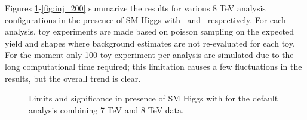 Figures \ref{fig:inj_125_7-8TeV}-\ref{fig:inj_200} summarize the results for various 8 TeV analysis 
configurations in the presence of SM Higgs with  \GeV\ and  \GeV\ respectively.
For each analysis, toy experiments are made based on poisson sampling on the expected yield 
and shapes where background estimates are not re-evaluated for each toy.
For the moment only 100 toy experiment per analysis are simulated due to the long computational time required; 
this limitation causes a few fluctuations in the results, but the overall trend is clear.

\begin{figure}[!hbtp]
\centering
{}
\caption{Limits and significance in presence of SM Higgs with  \GeV for the default analysis combining 7 TeV and 8 TeV data.}
\label{fig:inj_125_7-8TeV}
\end{figure}

